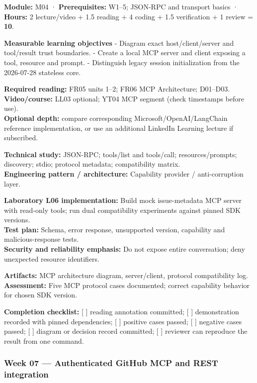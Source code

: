 \documentclass[
  10pt,
]{article}
\begin{document}
\textbf{Module:} M04 · \textbf{Prerequisites:} W1--5; JSON-RPC and
transport basics · \textbf{Hours:} 2 lecture/video + 1.5 reading + 4
coding + 1.5 verification + 1 review = \textbf{10}.

\textbf{Measurable learning objectives} - Diagram exact
host/client/server and tool/result trust boundaries. - Create a local
MCP server and client exposing a tool, resource and prompt. -
Distinguish legacy session initialization from the 2026-07-28 stateless
core.

\textbf{Required reading:} FR05 units 1--2; FR06 MCP Architecture;
D01--D03.\\
\textbf{Video/course:} LL03 optional; YT04 MCP segment (check timestamps
before use).\\
\textbf{Optional depth:} compare corresponding
Microsoft/OpenAI/LangChain reference implementation, or use an
additional LinkedIn Learning lecture if subscribed.

\textbf{Technical study:} JSON-RPC; tools/list and tools/call;
resources/prompts; discovery; stdio; protocol metadata; compatibility
matrix.\\
\textbf{Engineering pattern / architecture:} Capability provider /
anti-corruption layer.

\textbf{Laboratory L06 implementation:} Build mock issue-metadata MCP
server with read-only tools; run dual compatibility experiments against
pinned SDK versions.\\
\textbf{Test plan:} Schema, error response, unsupported version,
capability and malicious-response tests.\\
\textbf{Security and reliability emphasis:} Do not expose entire
conversation; deny unexpected resource identifiers.

\textbf{Artifacts:} MCP architecture diagram, server/client, protocol
compatibility log.\\
\textbf{Assessment:} Five MCP protocol cases documented; correct
capability behavior for chosen SDK version.

\textbf{Completion checklist:} {[} {]} reading annotation committed; {[}
{]} demonstration recorded with pinned dependencies; {[} {]} positive
cases passed; {[} {]} negative cases passed; {[} {]} diagram or decision
record committed; {[} {]} reviewer can reproduce the result from one
command.

\subsubsection{Week 07 --- Authenticated GitHub MCP and REST
integration}\label{week-07-authenticated-github-mcp-and-rest-integration}
\end{document}
